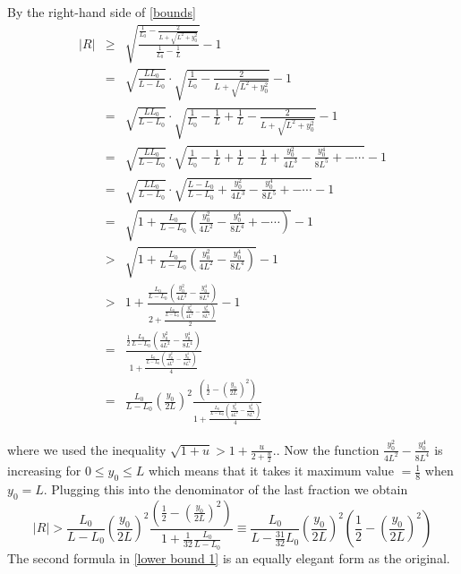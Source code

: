 \documentclass[12pt]{article}
\numberwithin{equation}{section}
\renewcommand{\geq}{\geqslant}  %
\renewcommand{\leq}{\leqslant}  %
\begin{document}
By the right-hand side of \eqref{bounds}
\begin{eqnarray*}
|R| & \geq & \sqrt{\frac{\frac{1}{L_0}-\frac{2}{L+\sqrt{L^2+y_0^2}}}{\frac{1}{L_0}-\frac{1}{L}}}-1 \\
 & = & \sqrt{\frac{LL_0}{L-L_0}}\cdot\sqrt{\frac{1}{L_0}-\frac{2}{L+\sqrt{L^2+y_0^2}}}-1\\
 & =&  \sqrt{\frac{LL_0}{L-L_0}}\cdot\sqrt{\frac{1}{L_0}-\frac{1}{L}+\frac{1}{L}-\frac{2}{L+\sqrt{L^2+y_0^2}}}-1\\
 & = &\sqrt{\frac{LL_0}{L-L_0}}\cdot\sqrt{\frac{1}{L_0}-\frac{1}{L}+\frac{1}{L}-\frac{1}{L}+\frac{y_0^2}{4L^3}-\frac{y_0^4}{8L^5}+-\cdots}-1\\
 &=&\sqrt{\frac{LL_0}{L-L_0}}\cdot\sqrt{\frac{L-L_0}{L-L_0}+\frac{y_0^2}{4L^3}-\frac{y_0^4}{8L^5}+-\cdots}-1\\
&=&\sqrt{1+\frac{L_0}{L-L_0}\left(\frac{y_0^2}{4L^2}-\frac{y_0^4}{8L^4}+-\cdots\right)}-1\\
&>&\sqrt{1+\frac{L_0}{L-L_0}\left(\frac{y_0^2}{4L^2}-\frac{y_0^4}{8L^4}\right)}-1\\
&>&1+\frac{\frac{L_0}{L-L_0}\left(\frac{y_0^2}{4L^2}-\frac{y_0^4}{8L^4}\right)}{2+\frac{\frac{L_0}{L-L_0}\left(\frac{y_0^2}{4L^2}-\frac{y_0^4}{8L^4}\right)}{2}}-1\\
&=&\frac{\frac{1}{2}\frac{L_0}{L-L_0}\left(\frac{y_0^2}{4L^2}-\frac{y_0^4}{8L^4}\right)}{1+\frac{\frac{L_0}{L-L_0}\left(\frac{y_0^2}{4L^2}-\frac{y_0^4}{8L^4}\right)}{4}}\\
&=& \frac{L_0}{L-L_0}\left(\frac{y_0}{2L}\right)^2\frac{\left(\frac{1}{2}-\left(\frac{y_0}{2L}\right)^2\right)}{1+\frac{\frac{L_0}{L-L_0}\left(\frac{y_0^2}{4L^2}-\frac{y_0^4}{8L^4}\right)}{4}}
\end{eqnarray*}

\noindent where we used the inequality $\sqrt{1+u}>1+\frac{u}{2+\frac{u}{2}}.$. Now the function $\frac{y_0^2}{4L^2}-\frac{y_0^4}{8L^4}$ is increasing for $0\leq y_0\leq L$ which means that it takes it maximum value $=\frac{1}{8}$ when $y_0=L.$ Plugging this into the denominator of the last fraction we obtain\begin{equation}
\label{lower bound 1}
|R|>\frac{L_0}{L-L_0}\left(\frac{y_0}{2L}\right)^2\frac{\left(\frac{1}{2}-\left(\frac{y_0}{2L}\right)^2\right)}{1+\frac{1}{32}\frac{L_0}{L-L_0}}\equiv\frac{L_0}{L-\frac{31}{32}L_0}\left(\frac{y_0}{2L}\right)^2\left(\frac{1}{2}-\left(\frac{y_0}{2L}\right)^2\right)
\end{equation}
\noindent The second formula in \eqref{lower bound 1} is an equally elegant form as the original.
\end{document}
